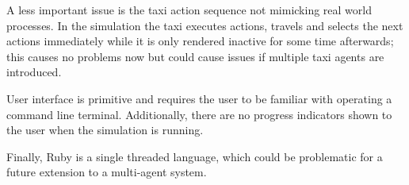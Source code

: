 A less important issue is the taxi action sequence not mimicking real world
processes. In the simulation the taxi executes actions, travels and selects the
next actions immediately while it is only rendered inactive for some time
afterwards; this causes no problems now but could cause issues if multiple taxi
agents are introduced.

User interface is primitive and requires the user to be familiar with operating
a command line terminal. Additionally, there are no progress indicators shown
to the user when the simulation is running.

Finally, Ruby is a single threaded language, which could be problematic for a
future extension to a multi-agent system.

